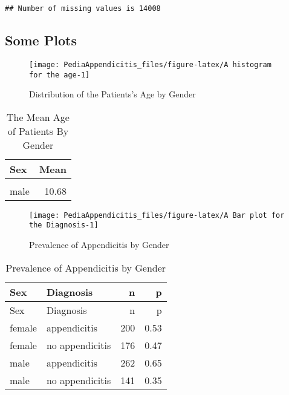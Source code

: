 \documentclass[
]{article}
\begin{document}
\begin{verbatim}
## Number of missing values is 14008
\end{verbatim}

\subsection{Some Plots}\label{some-plots}

\begin{figure}

{\centering \texttt{[image: PediaAppendicitis\_files/figure-latex/A histogram for the age-1]} 

}

\caption{Distribution of the Patients's Age by Gender}\label{fig:A histogram for the age}
\end{figure}

\begin{longtable}[t]{lr}
\caption{\label{tab:A histogram for the age}The Mean Age of Patients By Gender}\\
\toprule
Sex & Mean\\
\midrule
\cellcolor{gray!10}{female} & \cellcolor{gray!10}{12.06}\\
male & 10.68\\
\bottomrule
\end{longtable}

\begin{figure}

{\centering \texttt{[image: PediaAppendicitis\_files/figure-latex/A Bar plot for the Diagnosis-1]} 

}

\caption{Prevalence of Appendicitis by Gender}\label{fig:A Bar plot for the Diagnosis}
\end{figure}

\begin{longtable}[]{@{}llrr@{}}
\caption{Prevalence of Appendicitis by Gender}\tabularnewline
\toprule\noalign{}
Sex & Diagnosis & n & p \\
\midrule\noalign{}
\endfirsthead
\toprule\noalign{}
Sex & Diagnosis & n & p \\
\midrule\noalign{}
\endhead
\bottomrule\noalign{}
\endlastfoot
female & appendicitis & 200 & 0.53 \\
female & no appendicitis & 176 & 0.47 \\
male & appendicitis & 262 & 0.65 \\
male & no appendicitis & 141 & 0.35 \\
\end{longtable}
\end{document}
